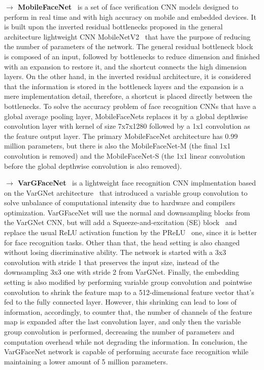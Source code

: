 \documentclass[class=report, crop=false, a4paper, 12pt]{standalone}
\begin{document}
\vspace{0.7\baselineskip}
\label{mobilefacenet}
\noindent\textbf{$\rightarrow$ MobileFaceNet}~\autocite{chenMobileFaceNetsEfficientCNNs2018} is a set of face verification CNN models designed to perform in real time and with high accuracy on mobile and embedded devices. It is built upon the inverted residual bottlenecks proposed in the general architecture lightweight CNN MobileNetV2~\autocite{sandlerMobileNetV2InvertedResiduals2019} that have the purpose of reducing the number of parameters of the network. The general residual bottleneck block~\autocite{heDeepResidualLearning2016} is composed of an input, followed by bottlenecks to reduce dimension and finished with an expansion to restore it, and the shortcut connects the high dimension layers. On the other hand, in the inverted residual architecture, it is considered that the information is stored in the bottleneck layers and the expansion is a mere implementation detail, therefore, a shortcut is placed directly between the bottlenecks. To solve the accuracy problem of face recognition CNNs that have a global average pooling layer, MobileFaceNets replaces it by a global depthwise convolution layer with kernel of size 7x7x1280 followed by a 1x1 convolution as the feature output layer. The primary MobileFaceNet architecture has 0.99 million parameters, but there is also the MobileFaceNet-M (the final 1x1 convolution is removed) and the MobileFaceNet-S (the 1x1 linear convolution before the global depthwise convolution is also removed).

\newpage
\noindent\textbf{$\rightarrow$ VarGFaceNet}~\autocite{yanVarGFaceNetEfficientVariable2019} is a lightweight face recognition CNN implmentation based on the VarGNet architecture~\autocite{zhangVarGNetVariableGroup2020} that introduced a variable group convolution to solve unbalance of computational intensity due to hardware and compilers optimization. VarGFaceNet will use the normal and downsampling blocks from the VarGNet CNN, but will add a Squeeze-and-excitation (SE) block~\autocite{huSqueezeandExcitationNetworks2019} and replace the usual ReLU activation function by the PReLU~\autocite{heDelvingDeepRectifiers2015} one, since it is better for face recognition tasks. Other than that, the head setting is also changed without losing discriminative ability. The network is started with a 3x3 convolution with stride 1 that preserves the input size, instead of the downsampling 3x3 one with stride 2 from VarGNet. Finally, the embedding setting is also modified by performing variable group convolution and pointwise convolution to shrink the feature map to a 512-dimensional feature vector that's fed to the fully connected layer. However, this shrinking can lead to loss of information, accordingly, to counter that, the number of channels of the feature map is expanded after the last convolution layer, and only then the variable group convolution is performed, decreasing the number of parameters and computation overhead while not degrading the information. In conclusion, the VarGFaceNet network is capable of performing accurate face recognition while maintaining a lower amount of 5 million parameters.
\end{document}
